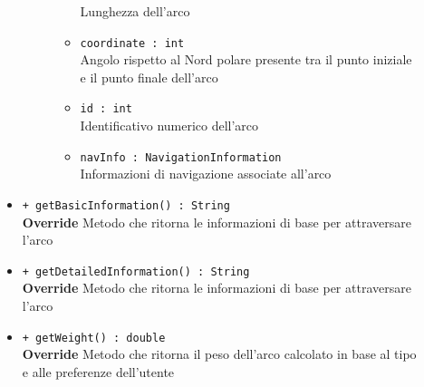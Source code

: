 \documentclass[../DefinizioneDiProdotto.tex]{subfiles}
\begin{document}
\begin{description}
\begin{itemize}
\begin{description}
\begin{itemize}
				Lunghezza dell'arco\item \texttt{coordinate : int}\\
				Angolo rispetto al Nord polare presente tra il punto iniziale e il punto finale dell'arco\item \texttt{id : int}\\
				Identificativo numerico dell'arco\item \texttt{navInfo : NavigationInformation}\\
				Informazioni di navigazione associate all'arco\end{itemize}
		\end{description}
		\item \texttt{+ getBasicInformation() : String}\\
		\textbf{Override} Metodo che ritorna le informazioni di base per attraversare l'arco
		\item \texttt{+ getDetailedInformation() : String}\\
		\textbf{Override} Metodo che ritorna le informazioni di base per attraversare l'arco
		\item \texttt{+ getWeight() : double}\\
		\textbf{Override} Metodo che ritorna il peso dell'arco calcolato in base al tipo e alle preferenze dell'utente
	\end{itemize}
\end{description}
\end{document}
